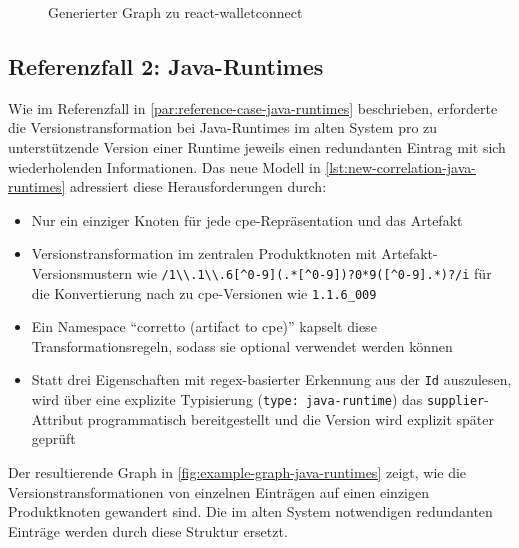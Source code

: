 \begin{figure}[htbp]
    \centering
    \makebox[\textwidth]{}
    \caption{Generierter Graph zu react-walletconnect}
    \label{fig:example-graph-walletconnect}
\end{figure}

\subsection{Referenzfall 2: Java-Runtimes}\label{subsec:example-java-runtimes}

Wie im Referenzfall in \autoref{par:reference-case-java-runtimes} beschrieben, erforderte die Versionstransformation bei Java-Runtimes im alten System pro zu unterstützende Version einer Runtime jeweils einen redundanten Eintrag mit sich wiederholenden Informationen.
Das neue Modell in \autoref{lst:new-correlation-java-runtimes} adressiert diese Herausforderungen durch:

\begin{itemize}
    \itemsep0em
    \item Nur ein einziger Knoten für jede \acrshort{cpe}-Repräsentation und das Artefakt
    \item Versionstransformation im zentralen Produktknoten mit Artefakt-Versionsmustern wie \verb|/1\\.1\\.6[^0-9](.*[^0-9])?0*9([^0-9].*)?/i| für die Konvertierung nach zu \acrshort{cpe}-Versionen wie \texttt{1.1.6\_009}
    \item Ein Namespace \enquote{corretto (artifact to cpe)} kapselt diese Transformationsregeln, sodass sie optional verwendet werden können
    \item Statt drei Eigenschaften mit regex-basierter Erkennung aus der \texttt{Id} auszulesen, wird über eine explizite Typisierung (\texttt{type: java-runtime}) das \texttt{supplier}-Attribut programmatisch bereitgestellt und die Version wird explizit später geprüft
\end{itemize}

Der resultierende Graph in \autoref{fig:example-graph-java-runtimes} zeigt, wie die Versionstransformationen von einzelnen Einträgen auf einen einzigen Produktknoten gewandert sind.
Die im alten System notwendigen redundanten Einträge werden durch diese Struktur ersetzt.

